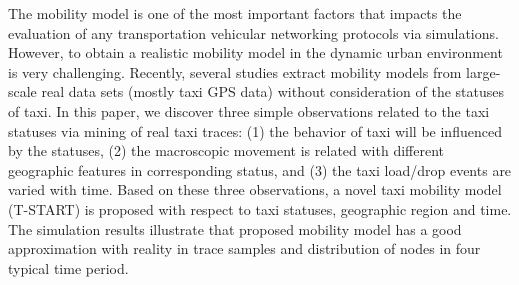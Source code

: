 
\begin{cabstract}



\end{cabstract}

\begin{eabstract}
The mobility model is one of the most important factors that impacts the evaluation of any transportation vehicular networking protocols via simulations. However, to obtain a realistic mobility model in the dynamic urban environment is very challenging. Recently, several studies extract mobility models from large-scale real data sets (mostly taxi GPS data) without consideration of the statuses of taxi. In this paper, we discover three simple observations related to the taxi statuses via mining of real taxi traces: (1) the behavior of taxi will be influenced by the statuses, (2) the macroscopic movement is related with different geographic features in corresponding status, and (3) the taxi load/drop events are varied with time. 
Based on these three observations, a novel taxi mobility model (T-START) is proposed with respect to taxi statuses, geographic region and time. The simulation results illustrate that proposed mobility model has a good approximation with reality in trace samples and distribution of nodes in four typical time period.
\end{eabstract}